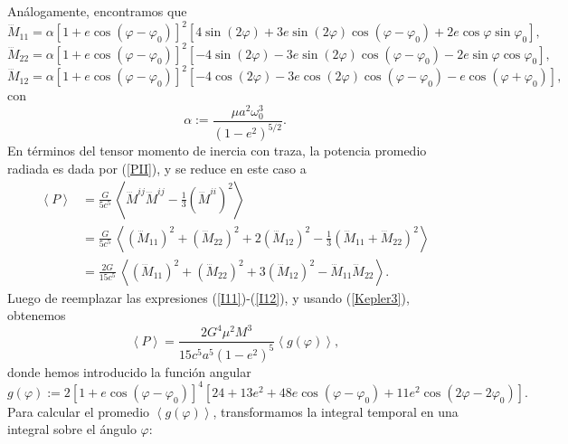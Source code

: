 Análogamente, encontramos que
\begin{equation}\label{I11}
\dddot{M}_{11}=\alpha\left[1+e\cos(\varphi-\varphi_0)\right]^2 \left[4\sin(2\varphi)+3e\sin(2\varphi)\cos(\varphi-\varphi_0)
+2e\cos\varphi\sin\varphi_0\right],
\end{equation}
\begin{equation}\label{I22}
\dddot{M}_{22}=\alpha\left[1+e\cos(\varphi-\varphi_0)\right]^2 \left[-4\sin(2\varphi)-3e\sin(2\varphi)\cos(\varphi-\varphi_0)
-2e\sin\varphi\cos\varphi_0\right],
\end{equation}
\begin{equation}\label{I12}
\dddot{M}_{12}=\alpha\left[1+e\cos(\varphi-\varphi_0)\right]^2 \left[-4\cos(2\varphi)-3e\cos(2\varphi)\cos(\varphi-\varphi_0)
-e\cos(\varphi+\varphi_0)\right],
\end{equation}
con
\begin{equation}
\alpha:=\frac{\mu a^2\omega_0^3}{\left(1-e^2\right)^{5/2}}.
\end{equation}
En términos del tensor momento de inercia con traza, la potencia promedio radiada es dada por (\ref{PII}), y se reduce en este caso a
\begin{align}
\left\langle P\right\rangle &=\frac{G}{5c^5}\, \left\langle \dddot{M}^{ij}\dddot{M}^{ij}-\frac{1}{3}\left(\dddot{M}^{ii}\right)^2\right\rangle \\
&=\frac{G}{5c^5}\, \left\langle \left(\dddot{M}_{11}\right)^2+ \left(\dddot{M}_{22}\right)^2+2 \left(\dddot{M}_{12}\right)^2-\frac{1}{3}\left(\dddot{M}_{11}+\dddot{M}_{22}\right)^2\right\rangle \\
&=\frac{2G}{15c^5}\, \left\langle \left(\dddot{M}_{11}\right)^2+ \left(\dddot{M}_{22}\right)^2+3\left(\dddot{M}_{12}\right)^2 -\dddot{M}_{11}\dddot{M}_{22}\right\rangle .
\end{align}
Luego de reemplazar las expresiones (\ref{I11})-(\ref{I12}), y usando (\ref{Kepler3}), obtenemos
\begin{equation}
\left\langle P\right\rangle = \frac{2G^4\mu^2M^3}{15c^5a^5\left(1-e^2\right)^{5}}\left\langle g(\varphi)\right\rangle ,
\end{equation}
donde hemos introducido la función angular
\begin{equation}\label{Pphi}
g(\varphi):=2\left[1+e\cos(\varphi-\varphi_0)\right]^4
\left[24+13e^2+48e\cos(\varphi-\varphi_0) +11e^2\cos(2\varphi-2\varphi_0)\right].
\end{equation}
Para calcular el promedio $\left\langle g(\varphi)\right\rangle$, transformamos la integral temporal en una integral sobre el ángulo $\varphi$:
